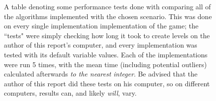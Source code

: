 \begin{figure}[H]
    \centering
    \begin{center}
    \end{center}
    \caption{A table denoting some performance tests done with comparing all of the algorithms implemented with the chosen scenario. This was done on every single implementation implementation of the game; the ``tests" were simply checking how long it took to create levels on the author of this report's computer, and every implementation was tested with its default variable values. Each of the implementations were run 5 times, with the mean time (including potential outliers) calculated afterwards \textit{to the nearest integer}. Be advised that the author of this report did these tests on his computer, so on different computers, results can, and likely \textit{will}, vary.}
    \label{fig:table6}
\end{figure}